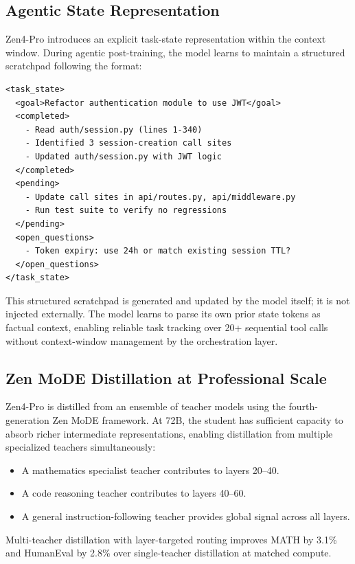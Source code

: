 \documentclass[11pt,a4paper]{article}
\begin{document}
\subsection{Agentic State Representation}

Zen4-Pro introduces an explicit task-state representation within the context window. During
agentic post-training, the model learns to maintain a structured scratchpad following the
format:

\begin{lstlisting}[caption=Agentic State Token Format]
<task_state>
  <goal>Refactor authentication module to use JWT</goal>
  <completed>
    - Read auth/session.py (lines 1-340)
    - Identified 3 session-creation call sites
    - Updated auth/session.py with JWT logic
  </completed>
  <pending>
    - Update call sites in api/routes.py, api/middleware.py
    - Run test suite to verify no regressions
  </pending>
  <open_questions>
    - Token expiry: use 24h or match existing session TTL?
  </open_questions>
</task_state>
\end{lstlisting}

This structured scratchpad is generated and updated by the model itself; it is not injected
externally. The model learns to parse its own prior state tokens as factual context, enabling
reliable task tracking over 20+ sequential tool calls without context-window management by
the orchestration layer.

\subsection{Zen MoDE Distillation at Professional Scale}

Zen4-Pro is distilled from an ensemble of teacher models using the fourth-generation Zen MoDE
framework. At 72B, the student has sufficient capacity to absorb richer intermediate
representations, enabling distillation from multiple specialized teachers simultaneously:

\begin{itemize}
    \item A mathematics specialist teacher contributes to layers 20--40.
    \item A code reasoning teacher contributes to layers 40--60.
    \item A general instruction-following teacher provides global signal across all layers.
\end{itemize}

Multi-teacher distillation with layer-targeted routing improves MATH by 3.1\% and HumanEval
by 2.8\% over single-teacher distillation at matched compute.
\end{document}
